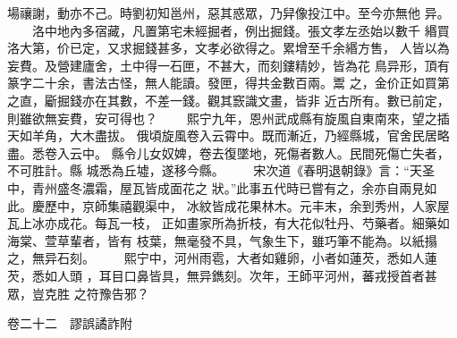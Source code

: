 \documentclass{ctexart}
\begin{document}
場禳謝，動亦不己。時劉初知邕州，惡其惑眾，乃舁像投江中。至今亦無他 异。 　　洛中地內多宿藏，凡置第宅未經掘者，例出掘錢。張文孝左丞始以數千 緡買洛大第，价已定，又求掘錢甚多，文孝必欲得之。累增至千余緡方售， 人皆以為妄費。及營建廬舍，土中得一石匣，不甚大，而刻鏤精妙，皆為花 鳥异形，頂有篆字二十余，書法古怪，無人能讀。發匣，得共金數百兩。鬻 之，金价正如買第之直，斸掘錢亦在其數，不差一錢。觀其窾識文畫，皆非 近古所有。數已前定，則雖欲無妄費，安可得也？ 　　熙宁九年，恩州武成縣有旋風自東南來，望之插天如羊角，大木盡拔。 俄頃旋風卷入云霄中。既而漸近，乃經縣城，官舍民居略盡。悉卷入云中。 縣令儿女奴婢，卷去復墜地，死傷者數人。民間死傷亡失者，不可胜計。縣 城悉為丘墟，遂移今縣。 　　宋次道《春明退朝錄》言：``天圣中，青州盛冬濃霜，屋瓦皆成面花之 狀。''此事五代時已嘗有之，余亦自兩見如此。慶歷中，京師集禧觀渠中， 冰紋皆成花果林木。元丰末，余到秀州，人家屋瓦上冰亦成花。每瓦一枝， 正如畫家所為折枝，有大花似牡丹、芍藥者。細藥如海棠、萱草輩者，皆有 枝葉，無毫發不具，气象生下，雖巧筆不能為。以紙搨之，無异石刻。 　　熙宁中，河州雨雹，大者如雞卵，小者如蓮芡，悉如人蓮芡，悉如人頭 ，耳目口鼻皆具，無异鐫刻。次年，王師平河州，蕃戎授首者甚眾，豈克胜 之符豫告邪？

卷二十二　謬誤譎詐附
\end{document}
